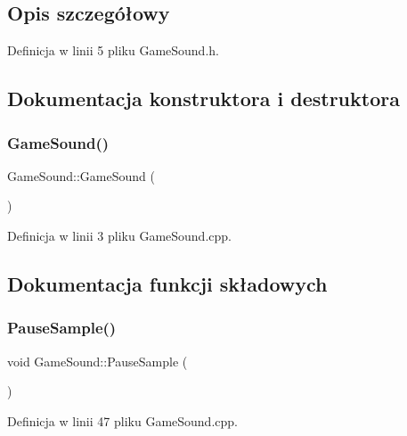 \subsection{Opis szczegółowy}


Definicja w linii 5 pliku Game\+Sound.\+h.



\subsection{Dokumentacja konstruktora i destruktora}
\mbox{\label{class_game_sound_a14feacd320c8a89e68cacf456920c8c1}} 
\subsubsection{\texorpdfstring{Game\+Sound()}{GameSound()}}
{\footnotesize\ttfamily Game\+Sound\+::\+Game\+Sound (\begin{DoxyParamCaption}{ }\end{DoxyParamCaption})}



Definicja w linii 3 pliku Game\+Sound.\+cpp.



\subsection{Dokumentacja funkcji składowych}
\mbox{\label{class_game_sound_a9b64e35e47dd7f06876be460c9cbf67f}} 
\subsubsection{\texorpdfstring{Pause\+Sample()}{PauseSample()}}
{\footnotesize\ttfamily void Game\+Sound\+::\+Pause\+Sample (\begin{DoxyParamCaption}{ }\end{DoxyParamCaption})}



Definicja w linii 47 pliku Game\+Sound.\+cpp.

\mbox{\label{class_game_sound_acd0ef105f4731da50afe47b3e02558a2}} 
